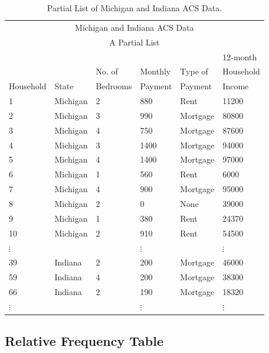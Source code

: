 \documentclass[11pt, chapterprefix=true]{scrbook}\usepackage[]{graphicx}\usepackage[]{color}
\begin{document}
\begin{table}[htbp]
   \centering
   \begin{tabular}{@{} p{2cm} p{2cm} p{2cm} p{2cm} p{2cm} p{2cm} @{}} \hline
      \multicolumn{6}{c}{Michigan and Indiana ACS Data} \\
      \multicolumn{6}{c}{A Partial List} \\
          &       &           &           &         & 12-month \\
          &       & No. of    & Monthly   & Type of & Household \\
Household &	State	& Bedrooms	& Payment	& Payment 	& Income \\ \hline

1	& Michigan	& 2	& 880	& Rent	& 11200 \\
2	& Michigan	& 3	& 990	& Mortgage	& 80800 \\
3	& Michigan	& 4	& 750	& Mortgage	& 87600 \\
4	& Michigan	& 3	& 1400 &	Mortgage &	94000 \\
5	& Michigan	& 4	& 1400 &	Mortgage &	97000 \\
6	& Michigan	& 1	& 560	& Rent	& 6000 \\
7	& Michigan	& 4	& 900	& Mortgage &	95000 \\
8	& Michigan	& 2	& 0	& None	& 39000 \\
9	& Michigan	& 1	& 380	& Rent	& 24370 \\
10	& Michigan & 2 &	910	& Rent &	54500 \\
$\vdots$ & & & $\vdots$ & &  $\vdots$ \\
39	& Indiana	& 2	& 200	& Mortgage	& 46000 \\
59	& Indiana	& 4	& 200	& Mortgage	& 38300 \\
66  &	Indiana	& 2	& 190	& Mortgage	& 18320 \\
$\vdots$ & & & $\vdots$ & &  $\vdots$ \\
\hline
   \end{tabular}
   \caption{Partial List of Michigan and Indiana ACS Data.}
   \label{tab:booktabs}
\end{table}

\subsection{Relative Frequency Table}
\end{document}
